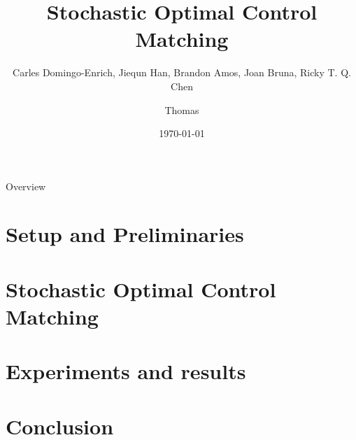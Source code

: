 \documentclass[aspectratio=169,xcolor=dvipsnames]{beamer}
\title{Stochastic Optimal Control Matching}
\subtitle{Carles Domingo-Enrich, Jiequn Han, Brandon Amos, Joan Bruna, Ricky T. Q. Chen}
\author{Thomas } %
\date{\today} %
\begin{document}
\begin{frame}
    \titlepage
\end{frame}

\begin{frame}{Overview}
    \tableofcontents
\end{frame}

\section{Setup and Preliminaries}



\section{Stochastic Optimal Control Matching}



\section{Experiments and results}



\section{Conclusion}
\end{document}
